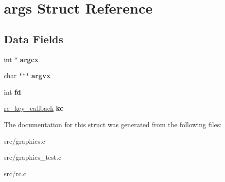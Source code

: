 \hypertarget{structargs}{}\section{args Struct Reference}
\label{structargs}
\subsection*{Data Fields}
\begin{DoxyCompactItemize}
\item 
int $\ast$ {\bfseries argcx}\hypertarget{structargs_a99fcb408f8f8539bdbdbce4d1ecc095d}{}\label{structargs_a99fcb408f8f8539bdbdbce4d1ecc095d}

\item 
char $\ast$$\ast$$\ast$ {\bfseries argvx}\hypertarget{structargs_a7e93bd8833dbe96d842f2d0c66c17564}{}\label{structargs_a7e93bd8833dbe96d842f2d0c66c17564}

\item 
int {\bfseries fd}\hypertarget{structargs_a02040157e81d1605fa863f38aa84a33e}{}\label{structargs_a02040157e81d1605fa863f38aa84a33e}

\item 
\hyperlink{group__rc_gaa7ca8d3e24ef0c270366ce6fd9bcd258}{rc\+\_\+key\+\_\+callback} {\bfseries kc}\hypertarget{structargs_ab740b1462c2f18e7fa232d5604365b2c}{}\label{structargs_ab740b1462c2f18e7fa232d5604365b2c}

\end{DoxyCompactItemize}


The documentation for this struct was generated from the following files\+:\begin{DoxyCompactItemize}
\item 
src/graphics.\+c\item 
src/graphics\+\_\+test.\+c\item 
src/rc.\+c\end{DoxyCompactItemize}
